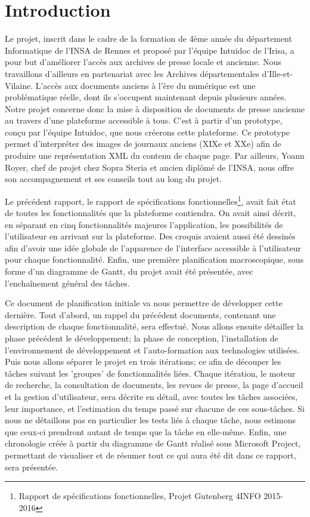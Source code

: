\section{Introduction}
\label{sec:intro}
	
	Le projet, inscrit dans le cadre de la formation de 4ème année du département Informatique de l’INSA de Rennes et proposé par l’équipe Intuidoc de l’Irisa, a pour but d’améliorer l’accès aux archives de presse locale et ancienne. Nous travaillons d'ailleurs en partenariat avec les Archives départementales d'Ille-et-Vilaine. L'accès aux documents anciens à l'ère du numérique est une problématique réelle, dont ils s'occupent maintenant depuis plusieurs années. Notre projet concerne donc la mise à disposition de documents de presse ancienne au travers d'une plateforme accessible à tous. C'est à partir d'un prototype, conçu par l'équipe Intuidoc, que nous créerons cette plateforme. Ce prototype permet d'interpréter des images de journaux anciens (XIXe et XXe) afin de produire une représentation XML du contenu de chaque page. Par ailleurs, Yoann Royer, chef de projet chez Sopra Steria et ancien diplômé de l'INSA, nous offre son accompagnement et ses conseils tout au long du projet.

	Le précédent rapport, le rapport de spécifications fonctionnelles\footnote{Rapport de spécifications fonctionnelles, Projet Gutenberg 4INFO 2015-2016}, avait fait état de toutes les fonctionnalités que la plateforme contiendra. On avait ainsi décrit, en séparant en cinq fonctionnalités majeures l'application, les possibilités de l'utilisateur en arrivant sur la plateforme. Des croquis avaient aussi été dessinés afin d'avoir une idée globale de l'apparence de l'interface accessible à l'utilisateur pour chaque fonctionnalité. Enfin, une première planification macroscopique, sous forme d'un diagramme de Gantt, du projet avait été présentée, avec l'enchaînement général des tâches.

	Ce document de planification initiale va nous permettre de développer cette dernière. Tout d'abord, un rappel du précédent documents, contenant une description de chaque fonctionnalité, sera effectué. Nous allons ensuite détailler la phase précédent le développement; la phase de conception, l'installation de l'environnement de développement et l'auto-formation aux technologies utilisées. Puis nous allons séparer le projet en trois itérations; ce afin de découper les tâches suivant les 'groupes' de fonctionnalités liées. Chaque itération, le moteur de recherche, la consultation de documents, les revues de presse, la page d'accueil et la gestion d'utilisateur, sera décrite en détail, avec toutes les tâches associées, leur importance, et l'estimation du temps passé sur chacune de ces sous-tâches. Si nous ne détaillons pas en particulier les tests liés à chaque tâche, nous estimons que ceux-ci prendront autant de temps que la tâche en elle-même. Enfin, une chronologie créée à partir du diagramme de Gantt réalisé sous Microsoft Project, permettant de visualiser et de résumer tout ce qui aura été dit dans ce rapport, sera présentée.
